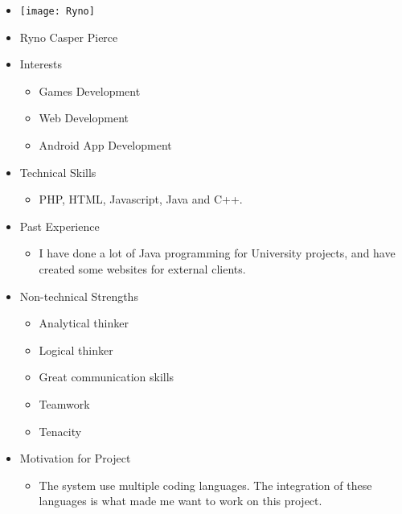 
\begin{itemize}
	\item[] \texttt{[image: Ryno]}
	\item[] Ryno Casper Pierce
	\item Interests
	\begin{itemize}
		\item Games Development
		\item Web Development
		\item Android App Development
	\end{itemize}
	\item Technical Skills
	\begin{itemize}
		\item[] PHP, HTML, Javascript, Java and C++.
	\end{itemize}
	\item Past Experience
	\begin{itemize}
		\item[] I have done a lot of Java programming for University projects, and have created some websites for external clients.
	\end{itemize}
	\item Non-technical Strengths
	\begin{itemize}
		\item Analytical thinker
		\item Logical thinker
		\item Great communication skills
		\item Teamwork
		\item Tenacity
	\end{itemize}
	\item Motivation for Project
	\begin{itemize}
		\item[] The system use multiple coding languages. The integration of these languages is what made me want to work on this project.
	\end{itemize}
\end{itemize}